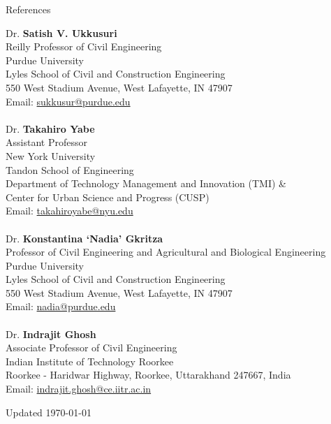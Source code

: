 \documentclass{CV} %
\begin{document}
\begin{rSection}{References}
    \begin{tabbing}
    Dr. \textbf{Satish V. Ukkusuri} \\
    Reilly Professor of Civil Engineering \\
    Purdue University \\ 
    Lyles School of Civil and Construction Engineering \\
    550 West Stadium Avenue, West Lafayette, IN 47907 \\
    Email: \href{mailto:sukkusur@purdue.edu}{sukkusur@purdue.edu} \\
    
    \\ Dr. \textbf{Takahiro Yabe} \\
    Assistant Professor \\
    New York University \\
    Tandon School of Engineering \\
    Department of Technology Management and Innovation (TMI) \& \\
    Center for Urban Science and Progress (CUSP) \\
    Email: \href{mailto:takahiroyabe@nyu.edu}{takahiroyabe@nyu.edu} \\
    
    \\ Dr. \textbf{Konstantina `Nadia' Gkritza} \\
    Professor of Civil Engineering and Agricultural and Biological Engineering \\
    Purdue University \\ 
    Lyles School of Civil and Construction Engineering \\
    550 West Stadium Avenue, West Lafayette, IN 47907 \\
    Email: \href{mailto:nadia@purdue.edu}{nadia@purdue.edu} \\

    \\ Dr. \textbf{Indrajit Ghosh} \\
    Associate Professor of Civil Engineering \\
    Indian Institute of Technology Roorkee \\ 
    Roorkee - Haridwar Highway, Roorkee, Uttarakhand 247667, India \\
    Email: \href{mailto:indrajit.ghosh@ce.iitr.ac.in}{indrajit.ghosh@ce.iitr.ac.in} \\
    \end{tabbing}
\end{rSection}

\vspace*{\fill}
\centering Updated \today
\end{document}
